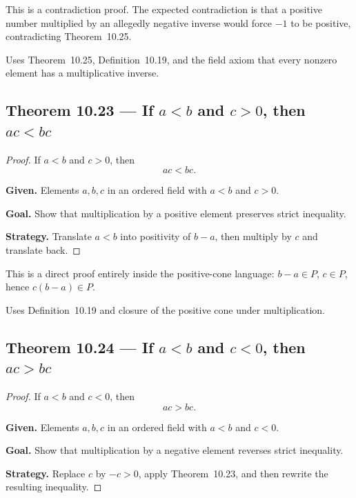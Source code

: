 \begin{remark*}
This is a contradiction proof.  The expected contradiction is that a positive
number multiplied by an allegedly negative inverse would force $-1$ to be
positive, contradicting Theorem~10.25.
\end{remark*}

\begin{remark*}[Dependencies]
Uses Theorem~10.25, Definition~10.19, and the field axiom that every nonzero
element has a multiplicative inverse.
\end{remark*}


\subsection*{Theorem 10.23 — If $a<b$ and $c>0$, then $ac<bc$}
\label{prf:grep-multiply-by-positive}

\begin{proof}
\Claim If $a<b$ and $c>0$, then
\[
ac < bc.
\]

\textbf{Given.} Elements $a,b,c$ in an ordered field with $a<b$ and $c>0$.

\textbf{Goal.} Show that multiplication by a positive element preserves strict inequality.

\textbf{Strategy.} Translate $a<b$ into positivity of $b-a$, then multiply by $c$ and translate back.


\end{proof}

\begin{remark*}
This is a direct proof entirely inside the positive-cone language:
$b-a \in P$, $c \in P$, hence $c(b-a) \in P$.
\end{remark*}

\begin{remark*}[Dependencies]
Uses Definition~10.19 and closure of the positive cone under multiplication.
\end{remark*}


\subsection*{Theorem 10.24 — If $a<b$ and $c<0$, then $ac>bc$}
\label{prf:grep-multiply-by-negative}

\begin{proof}
\Claim If $a<b$ and $c<0$, then
\[
ac > bc.
\]

\textbf{Given.} Elements $a,b,c$ in an ordered field with $a<b$ and $c<0$.

\textbf{Goal.} Show that multiplication by a negative element reverses strict inequality.

\textbf{Strategy.} Replace $c$ by $-c>0$, apply Theorem~10.23, and then rewrite the resulting inequality.


\end{proof}

